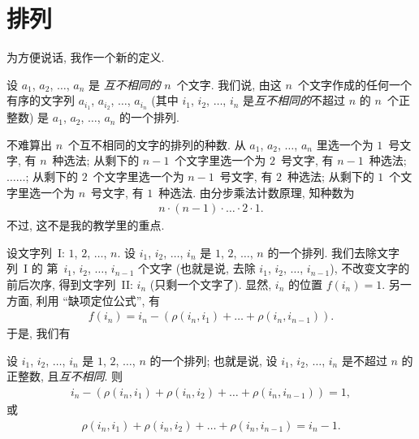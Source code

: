 \KunAsteriskoEnEnhavtabelo
\section{排列}
\SenAsteriskoEnEnhavtabelo

\maldevigalegajxo

为方便说话, 我作一个新的定义.

\begin{definition}[排列]
    设 \(a_1\), \(a_2\), \(\dots\), \(a_n\) 是%
    \emph{互不相同的} \(n\)~个文字.
    我们说, 由这 \(n\)~个文字作成的任何一个有序的文字列
    \(a_{i_1}\), \(a_{i_2}\), \(\dots\), \(a_{i_n}\)
    (其中 \(i_1\), \(i_2\), \(\dots\), \(i_n\)
    是\emph{互不相同的}不超过 \(n\) 的 \(n\)~个正整数)
    是 \(a_1\), \(a_2\), \(\dots\), \(a_n\)
    的一个排列.
\end{definition}

不难算出 \(n\)~个互不相同的文字的排列的种数.
从 \(a_1\), \(a_2\), \(\dots\), \(a_n\) 里选一个为 \(1\)~号文字,
有 \(n\)~种选法;
从剩下的 \(n-1\)~个文字里选一个为 \(2\)~号文字,
有 \(n-1\)~种选法;
\(\dots \dots\);
从剩下的 \(2\)~个文字里选一个为 \(n-1\)~号文字,
有 \(2\)~种选法;
从剩下的 \(1\)~个文字里选一个为 \(n\)~号文字,
有 \(1\)~种选法.
由分步乘法计数原理, 知种数为
\begin{align*}
    n \cdot (n - 1) \cdot \dots \cdot 2 \cdot 1.
\end{align*}
不过, 这不是我的教学里的重点.

设文字列~I: \(1\), \(2\), \(\dots\), \(n\).
设 \(i_1\), \(i_2\), \(\dots\), \(i_n\) 是
\(1\), \(2\), \(\dots\), \(n\) 的一个排列.
我们去除文字列~I 的%
第~\(i_1\), \(i_2\), \(\dots\), \(i_{n-1}\) 个文字
(也就是说, 去除 \(i_1\), \(i_2\), \(\dots\), \(i_{n-1}\)),
不改变文字的前后次序,
得到文字列~II: \(i_n\)
(只剩一个文字了).
显然, \(i_n\) 的位置 \(f(i_n) = 1\).
另一方面, 利用 ``缺项定位公式'', 有
\begin{align*}
    f(i_n) = i_n - (\rho(i_n, i_1) + \dots + \rho(i_n, i_{n-1})).
\end{align*}
于是, 我们有

\begin{theorem}
    设
    \(i_1\), \(i_2\), \(\dots\), \(i_n\)
    是
    \(1\), \(2\), \(\dots\), \(n\)
    的一个排列;
    也就是说, 设
    \(i_1\), \(i_2\), \(\dots\), \(i_n\)
    是不超过 \(n\) 的正整数, 且\emph{互不相同}.
    则
    \begin{align*}
        i_n - (\rho(i_n, i_1) + \rho(i_n, i_2)
        + \dots + \rho(i_n, i_{n-1})) = 1,
    \end{align*}
    或
    \begin{align*}
        \rho(i_n, i_1) + \rho(i_n, i_2)
        + \dots + \rho(i_n, i_{n-1}) = i_n - 1.
    \end{align*}
\end{theorem}

